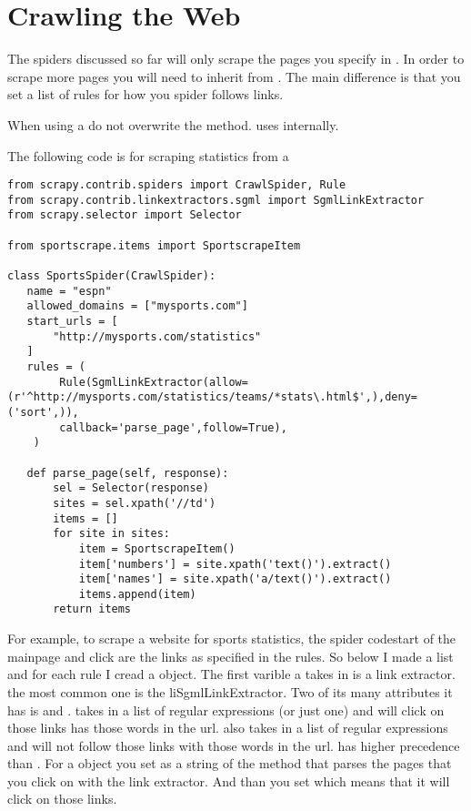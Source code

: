 {\section*{Crawling the Web}
The spiders discussed so far will only scrape the pages you specify in . In order to scrape more pages you will need to inherit from . The main difference is that you set a list of rules for how you spider follows links.

\begin{warn}
When using a  do not overwrite the  method. 
 uses  internally.
\end{warn}

The following code is for scraping statistics from a 

\begin{lstlisting}
from scrapy.contrib.spiders import CrawlSpider, Rule
from scrapy.contrib.linkextractors.sgml import SgmlLinkExtractor
from scrapy.selector import Selector

from sportscrape.items import SportscrapeItem

class SportsSpider(CrawlSpider):
   name = "espn"
   allowed_domains = ["mysports.com"]
   start_urls = [
       "http://mysports.com/statistics"
   ]
   rules = (
        Rule(SgmlLinkExtractor(allow=(r'^http://mysports.com/statistics/teams/*stats\.html$',),deny=('sort',)),
		callback='parse_page',follow=True),
    )

   def parse_page(self, response):
       sel = Selector(response)
       sites = sel.xpath('//td')
       items = []
       for site in sites:
           item = SportscrapeItem()
           item['numbers'] = site.xpath('text()').extract()
           item['names'] = site.xpath('a/text()').extract()
           items.append(item)
       return items
\end{lstlisting}
For example, to scrape a website for sports statistics, the spider codestart of the mainpage and click are the links as specified in the rules. So below I made a list and for each rule I cread a  object. The first varible a takes in is a link extractor. the most common one is the li{SgmlLinkExtractor}. Two of its many attributes it has is  and .  takes in a list of regular expressions (or just one) and will click on those links has those words in the url.  also takes in a list of regular expressions and will not follow those links with those words in the url.  has higher precedence than . For a  object you set  as a string of the method that parses the pages that you click on with the link extractor.  And than you set  which means that it will click on those links.

}
